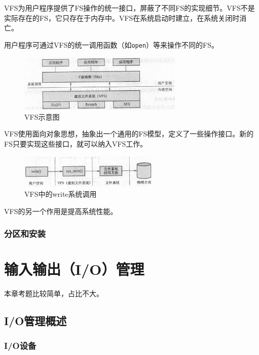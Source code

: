 \documentclass[12pt, a4paper, oneside]{ctexart}
\begin{document}
VFS为用户程序提供了FS操作的统一接口，屏蔽了不同FS的实现细节。VFS不是实际存在的FS，它只存在于内存中。VFS在系统启动时建立，在系统关闭时消亡。

用户程序可通过VFS的统一调用函数（如\verb|open|）等来操作不同的FS。

\begin{figure}[h]
  \centering
  \includegraphics[width=0.7\textwidth]{./images/vfs.png}
  \caption{VFS示意图}
\end{figure}

VFS使用面向对象思想，抽象出一个通用的FS模型，定义了一些操作接口。新的FS只要实现这些接口，就可以纳入VFS工作。

\begin{figure}[h]
  \centering
  \includegraphics[width=0.6\textwidth]{./images/write-in-vfs.png}
  \caption{VFS中的write系统调用}
\end{figure}

VFS的另一个作用是提高系统性能。

\subsubsection{分区和安装}

\section{输入输出（I/O）管理}

本章考题比较简单，占比不大。

\subsection{I/O管理概述}

\subsubsection{I/O设备}
\end{document}
